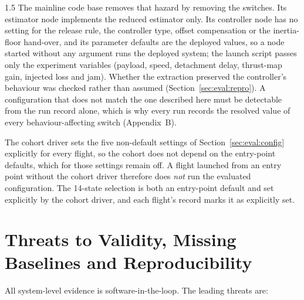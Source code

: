 \begin{spacing}{1.5}
The mainline code base removes that hazard by removing the switches. Its
estimator node implements the reduced estimator only. Its controller node has no
setting for the release rule, the controller type, offset compensation or the
inertia-floor hand-over, and its parameter defaults are the deployed values, so
a node started without any argument runs the deployed system; the launch script
passes only the experiment variables (payload, speed, detachment delay,
thrust-map gain, injected loss and jam). Whether the extraction preserved the
controller's behaviour was checked rather than assumed
(Section~\ref{sec:eval:repro}). A configuration
that does not match the one described here must be detectable from the run
record alone, which is why every run records the resolved value of every
behaviour-affecting switch (Appendix~B).

The cohort driver sets the five non-default settings of
Section~\ref{sec:eval:config} explicitly for every flight, so the cohort does not
depend on the entry-point defaults, which for those settings remain off. A flight launched from an
entry point without the cohort driver therefore does \emph{not} run the
evaluated configuration. The 14-state selection is both an entry-point default
and set explicitly by the cohort driver, and each flight's record marks it as
explicitly set.

\section{Threats to Validity, Missing Baselines and Reproducibility}\label{sec:eval:validity}

All system-level evidence is software-in-the-loop. The leading threats are:


\end{spacing}
